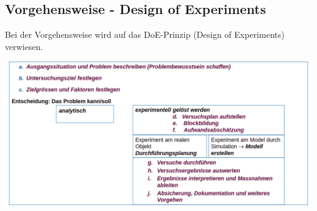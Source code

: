 \subsection{Vorgehensweise - Design of Experiments}

Bei der Vorgehensweise wird auf das DoE-Prinzip (Design of Experiments) verwiesen.

\begin{minipage}[t]{0.9\textwidth}
\centering
\includegraphics[width=0.9\linewidth]{images/doe.png}
\end{minipage}

